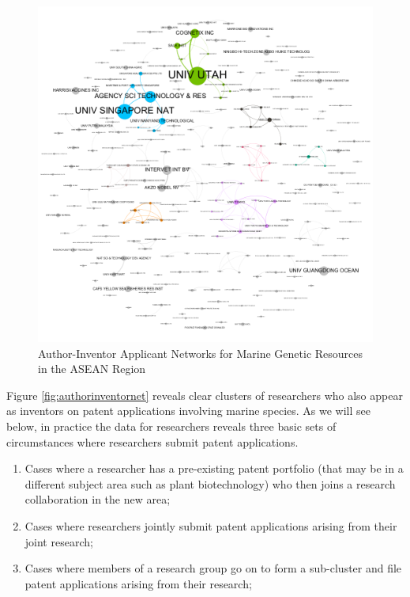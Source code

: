 \documentclass[openany]{book}
\providecommand{\tightlist}{%
  \setlength{\itemsep}{0pt}\setlength{\parskip}{0pt}}
\theoremstyle{definition}
\theoremstyle{definition}
\theoremstyle{definition}
\theoremstyle{remark}
\begin{document}
\begin{figure}

{\centering \includegraphics[width=1\linewidth]{images-patents/author_inventor_applicants_network} 

}

\caption{Author-Inventor Applicant Networks for Marine Genetic Resources in the ASEAN Region}\label{fig:authorapplicantnet}
\end{figure}

Figure \ref{fig:authorinventornet} reveals clear clusters of researchers
who also appear as inventors on patent applications involving marine
species. As we will see below, in practice the data for researchers
reveals three basic sets of circumstances where researchers submit
patent applications.

\begin{enumerate}
\def\labelenumi{\alph{enumi})}
\tightlist
\item
  Cases where a researcher has a pre-existing patent portfolio (that may
  be in a different subject area such as plant biotechnology) who then
  joins a research collaboration in the new area;
\item
  Cases where researchers jointly submit patent applications arising
  from their joint research;
\item
  Cases where members of a research group go on to form a sub-cluster
  and file patent applications arising from their research;
\end{enumerate}
\end{document}
